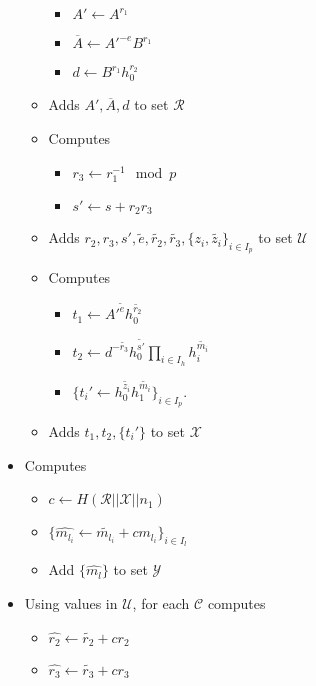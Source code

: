 \documentclass[a4paper]{article}
\begin{document}
\begin{itemize}
\begin{itemize}
\begin{itemize}
                \item $A'\leftarrow A^{r_1}$
                \item $\overline{A}\leftarrow A'^{-e}B^{r_1}$
                \item $d\leftarrow B^{r_1}h_0^{r_2}$
            \end{itemize}
        \item Adds $A', \overline{A}, d$ to set $\mathcal{R}$
        \item Computes
            \begin{itemize}
                \item $r_3\leftarrow r_1^{-1} \mod p$
                \item $s'\leftarrow s+r_2r_3$
            \end{itemize}
        \item Adds $r_2, r_3, s' , \widetilde{e},\widetilde{r_2},\widetilde{r_3},\{z_i, \widetilde{z_i}\}_{i \in I_p}$ to set $\mathcal{U}$
        \item Computes
        \begin{itemize}
                \item $t_1\leftarrow A'^{\widetilde{e}}h_0^{\widetilde{r_2}}$
                \item $t_2 \leftarrow  d^{-\widetilde{r_3}}h_0^{\widetilde{s'}}\prod_{i\in I_h}h_i^{\widetilde{m_i}}$
                \item $\{t_i'\leftarrow h_0^{\widetilde{z_i}}h_1^{\widetilde{m_i}}\}_{i\in I_p}$.
            \end{itemize}
        \item Adds $t_1, t_2, \{t_i'\}$ to set $\mathcal{X}$
    \end{itemize}
    \item Computes
    \begin{itemize}
        \item $c \leftarrow H(\mathcal{R}||\mathcal{X}||n_1)$
        \item $\{\widehat{m_{l_i}} \leftarrow \widetilde{m_{l_i}} + c m_{l_i}\}_{i \in I_l}$
        \item Add $\{\widehat{m_l}\}$ to set $\mathcal{Y}$
    \end{itemize}
    \item Using values in $\mathcal{U}$, for each $\mathcal{C}$ computes
    \begin{itemize}
        \item $\widehat{r_2} \leftarrow \widetilde{r_2} + c r_2$
        \item $\widehat{r_3} \leftarrow \widetilde{r_3} + c r_3$

\end{itemize}
\end{itemize}
\end{document}
